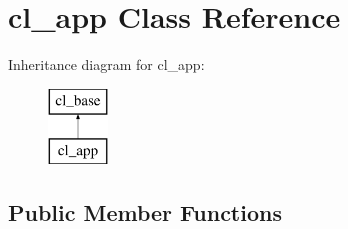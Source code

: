 \hypertarget{classcl__app}{
\section{cl\_\-app Class Reference}
\label{classcl__app}
}
Inheritance diagram for cl\_\-app:\begin{figure}[H]
\begin{center}
\leavevmode
\includegraphics[height=2.000000cm]{classcl__app}
\end{center}
\end{figure}
\subsection*{Public Member Functions}
